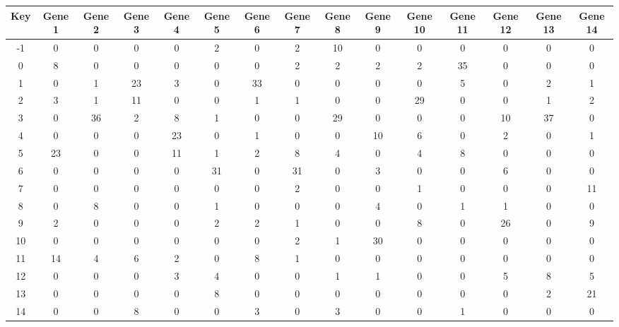 \begin{tabular}{|c|c|c|c|c|c|c|c|c|c|c|c|c|c|c|}
\hline
Key & Gene 1 & Gene 2 & Gene 3 & Gene 4 & Gene 5 & Gene 6 & Gene 7 & Gene 8 & Gene 9 & Gene 10 & Gene 11 & Gene 12 & Gene 13 & Gene 14 \\
\hline
-1 & 0 & 0 & 0 & 0 & 2 & 0 & 2 & 10 & 0 & 0 & 0 & 0 & 0 & 0 \\
0 & 8 & 0 & 0 & 0 & 0 & 0 & 2 & 2 & 2 & 2 & 35 & 0 & 0 & 0 \\
1 & 0 & 1 & 23 & 3 & 0 & 33 & 0 & 0 & 0 & 0 & 5 & 0 & 2 & 1 \\
2 & 3 & 1 & 11 & 0 & 0 & 1 & 1 & 0 & 0 & 29 & 0 & 0 & 1 & 2 \\
3 & 0 & 36 & 2 & 8 & 1 & 0 & 0 & 29 & 0 & 0 & 0 & 10 & 37 & 0 \\
4 & 0 & 0 & 0 & 23 & 0 & 1 & 0 & 0 & 10 & 6 & 0 & 2 & 0 & 1 \\
5 & 23 & 0 & 0 & 11 & 1 & 2 & 8 & 4 & 0 & 4 & 8 & 0 & 0 & 0 \\
6 & 0 & 0 & 0 & 0 & 31 & 0 & 31 & 0 & 3 & 0 & 0 & 6 & 0 & 0 \\
7 & 0 & 0 & 0 & 0 & 0 & 0 & 2 & 0 & 0 & 1 & 0 & 0 & 0 & 11 \\
8 & 0 & 8 & 0 & 0 & 1 & 0 & 0 & 0 & 4 & 0 & 1 & 1 & 0 & 0 \\
9 & 2 & 0 & 0 & 0 & 2 & 2 & 1 & 0 & 0 & 8 & 0 & 26 & 0 & 9 \\
10 & 0 & 0 & 0 & 0 & 0 & 0 & 2 & 1 & 30 & 0 & 0 & 0 & 0 & 0 \\
11 & 14 & 4 & 6 & 2 & 0 & 8 & 1 & 0 & 0 & 0 & 0 & 0 & 0 & 0 \\
12 & 0 & 0 & 0 & 3 & 4 & 0 & 0 & 1 & 1 & 0 & 0 & 5 & 8 & 5 \\
13 & 0 & 0 & 0 & 0 & 8 & 0 & 0 & 0 & 0 & 0 & 0 & 0 & 2 & 21 \\
14 & 0 & 0 & 8 & 0 & 0 & 3 & 0 & 3 & 0 & 0 & 1 & 0 & 0 & 0 \\
\hline
\end{tabular}